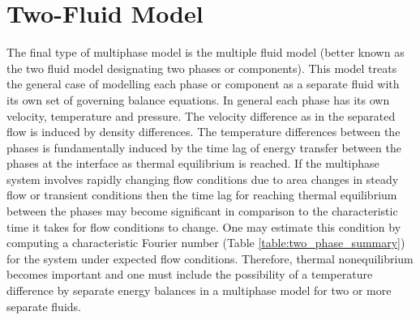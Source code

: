 
\section{Two-Fluid Model}

The final type of multiphase model is the multiple fluid model (better known as the two fluid model designating two phases or components).
This model treats the general case of modelling each phase or component as a separate fluid with its own set of governing balance equations.
In general each phase has its own velocity, temperature and pressure.
The velocity difference as in the separated flow is induced by density differences.
The temperature differences between the phases is fundamentally induced by the time lag of energy transfer between the phases at the interface as thermal equilibrium is reached.
If the multiphase system involves rapidly changing flow conditions due to area changes in steady flow or transient conditions then the time lag for reaching thermal equilibrium between the phases may become significant in comparison to the characteristic time it takes for flow conditions to change.
One may estimate this condition by computing a characteristic Fourier number (Table \ref{table:two_phase_summary}) for the system under expected flow conditions.
Therefore, thermal nonequilibrium becomes important and one must include the possibility of a temperature difference by separate energy balances in a multiphase model for two or more separate fluids.


